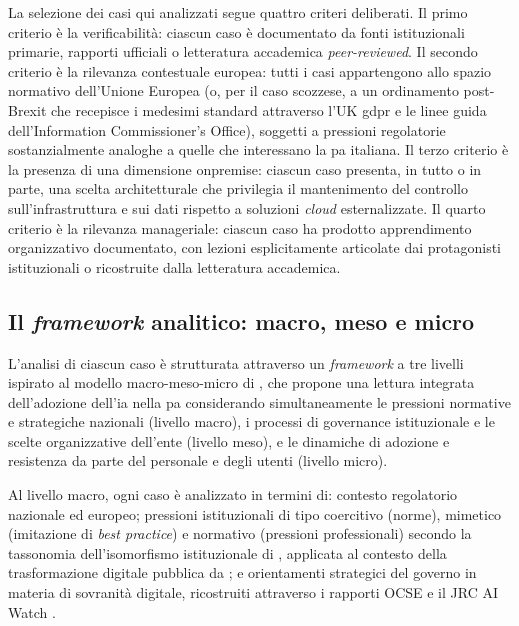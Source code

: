 La selezione dei casi qui analizzati segue quattro criteri deliberati. Il
primo criterio è la verificabilità: ciascun caso è documentato
da fonti istituzionali primarie, rapporti ufficiali o letteratura accademica
\textit{peer-reviewed}. Il secondo criterio è la rilevanza
contestuale europea: tutti i casi appartengono allo spazio normativo
dell'Unione Europea (o, per il caso scozzese, a un ordinamento post-Brexit che
recepisce i medesimi standard attraverso l'UK \gls{gdpr} e le linee guida
dell'Information Commissioner's Office), soggetti a pressioni regolatorie
sostanzialmente analoghe a quelle che interessano la \gls{pa} italiana.
Il terzo criterio è la presenza di una dimensione
\gls{onpremise}: ciascun caso presenta, in tutto o in parte, una scelta
architetturale che privilegia il mantenimento del controllo sull'infrastruttura
e sui dati rispetto a soluzioni \textit{cloud} esternalizzate. Il quarto
criterio è la rilevanza manageriale: ciascun caso ha prodotto apprendimento
organizzativo documentato, con lezioni esplicitamente articolate dai protagonisti
istituzionali o ricostruite dalla letteratura accademica.

\subsection{Il \textit{framework} analitico: macro, meso e micro}

L'analisi di ciascun caso è strutturata attraverso un \textit{framework} a tre
livelli ispirato al modello macro-meso-micro di \textcite{ValleCruzMacroMesoMicro2024},
che propone una lettura integrata dell'adozione dell'\gls{ia} nella \gls{pa} considerando
simultaneamente le pressioni normative e strategiche nazionali (livello
macro), i processi di governance istituzionale e le scelte organizzative
dell'ente (livello meso), e le dinamiche di adozione e resistenza
da parte del personale e degli utenti (livello micro).

Al livello macro, ogni caso è analizzato in termini di: contesto regolatorio
nazionale ed europeo; pressioni istituzionali di tipo coercitivo (norme),
mimetico (imitazione di \textit{best practice}) e normativo (pressioni
professionali) secondo la tassonomia dell'isomorfismo istituzionale di
\textcite{DiMaggioPow1983}, applicata al contesto della trasformazione digitale
pubblica da \textcite{PatalonIsomorphism2024}; e orientamenti strategici del
governo in materia di sovranità digitale, ricostruiti attraverso i rapporti
OCSE \parencite{OECDGoverningAI2025} e il JRC AI Watch \parencite{MisuracaVanNoort2020}.


